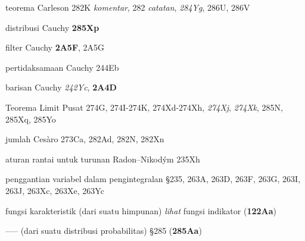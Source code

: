  teorema Carleson 282K {\it komentar}, 282 {\it catatan}, {\it 284Yg}, 286U, 286V













 distribusi Cauchy {\bf 285Xp}


filter Cauchy {\bf 2A5F}, 2A5G


pertidaksamaan Cauchy 244Eb




barisan Cauchy {\it 242Yc}, {\bf 2A4D}































 Teorema Limit Pusat 274G, 274I-274K, 274Xd-274Xh, {\it 274Xj}, {\it 274Xk}, 285N, 285Xq, 285Yo


 jumlah Ces\`aro 273Ca, 282Ad, 282N, 282Xn











aturan rantai untuk turunan Radon--Nikod\'ym 235Xh







 penggantian variabel dalam pengintegralan \S235, 263A, 263D, 263F, 263G, 263I, 263J, 263Xc, 263Xe, 263Yc





 fungsi karakteristik (dari suatu himpunan) {\it lihat} fungsi indikator ({\bf 122Aa})

----- (dari suatu distribusi probabilitas) \S285 ({\bf 285Aa})



